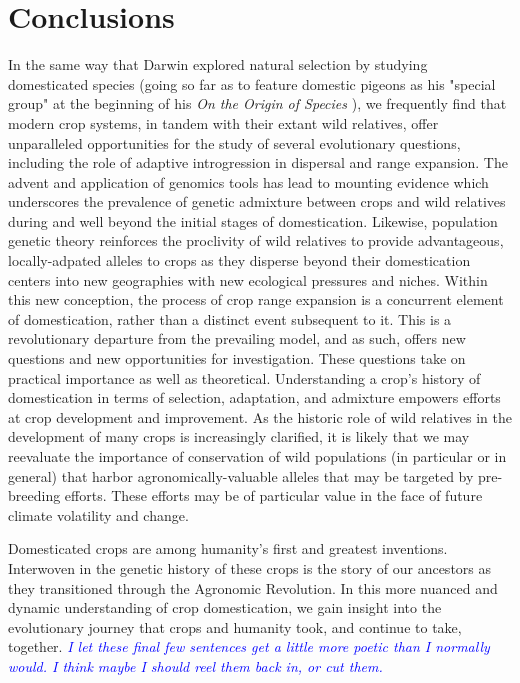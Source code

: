 \documentclass[11pt]{article}
\newcommand{\gmj}[1]{\textcolor{blue}{ \emph{\scriptsize  #1}} } %
\begin{document}
\section*{Conclusions}

In the same way that Darwin explored natural selection by studying domesticated species (going so far as to feature domestic pigeons as his "special group" at the beginning of his 
\emph{On the Origin of Species} \cite{darwin2009origin}), we frequently find that modern crop systems, in tandem with their extant wild relatives, offer unparalleled opportunities for the study of several evolutionary questions, including the role of adaptive introgression in dispersal and range expansion.
The advent and application of genomics tools has lead to mounting evidence which underscores the prevalence of genetic admixture between crops and wild relatives during and well beyond the initial stages of domestication.
Likewise, population genetic theory reinforces the proclivity of wild relatives to provide advantageous, locally-adpated alleles to crops as they disperse beyond their domestication centers into new geographies with new ecological pressures and niches.
Within this new conception, the process of crop range expansion is a concurrent element of domestication, rather than a distinct event subsequent to it.
This is a revolutionary departure from the prevailing model, and as such, offers new questions and new opportunities for investigation.
These questions take on practical importance as well as theoretical.
Understanding a crop's history of domestication in terms of selection, adaptation, and admixture empowers efforts at crop development and improvement.
As the historic role of wild relatives in the development of many crops is increasingly clarified, it is likely that we may reevaluate the importance of conservation of wild populations (in particular or in general) that harbor agronomically-valuable alleles that may be targeted by pre-breeding efforts.
These efforts may be of particular value in the face of future climate volatility and change.

Domesticated crops are among humanity's first and greatest inventions.
Interwoven in the genetic history of these crops is the story of our ancestors as they transitioned through the Agronomic Revolution.
In this more nuanced and dynamic understanding of crop domestication, we gain insight into the evolutionary journey that crops and humanity took, and continue to take, together.
\gmj{I let these final few sentences get a little more poetic than I normally would.  I think maybe I should reel them back in, or cut them.}
\end{document}
